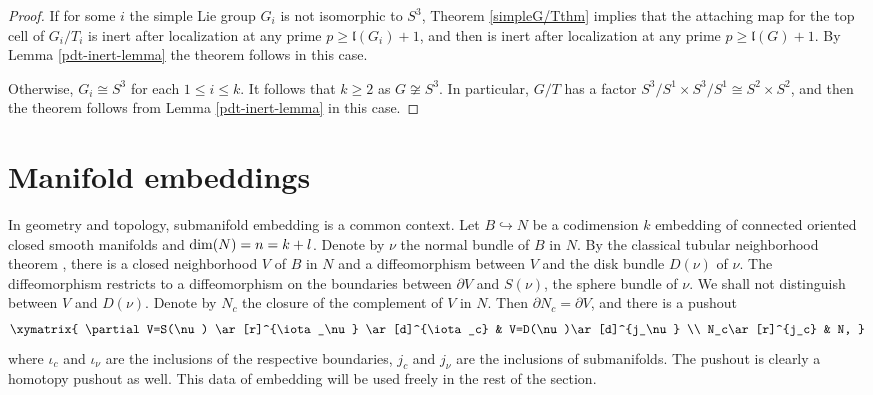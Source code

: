\documentclass[a4]{amsart}
\theoremstyle{definition}
\begin{document}
\begin{sloppypar}
\begin{proof}
If for some $i$ the simple Lie group $G_i$ is not isomorphic to $S^3$, Theorem \ref{simpleG/Tthm} implies that the attaching map for the top cell of $G_i/T_i$ is inert after localization at any prime $p\geq  \mathfrak{l}(G_i)+1$, and then is inert after localization at any prime $p\geq  \mathfrak{l}(G)+1$. By Lemma \ref{pdt-inert-lemma} the theorem follows in this case. 

Otherwise, $G_i\cong S^3$ for each $1\leq i\leq k$. It follows that $k\geq 2$ as $G\not\cong S^3$. In particular, $G/T$ has a factor $S^3/S^1\times S^3/S^1\cong S^2\times S^2$, and then the theorem follows from Lemma \ref{pdt-inert-lemma} in this case. 
\end{proof}



\newpage
\section{Manifold embeddings}
\label{sec: emb}

In geometry and topology, submanifold embedding is a common context. Let $B\hookrightarrow N$ be a codimension $k$ embedding of connected oriented closed smooth manifolds and ${\rm dim}(N)=n=k+l$. 
Denote by $\nu$ the normal bundle of $B$ in $N$. By the classical tubular neighborhood theorem \cite[Theorem 11.1]{MS74}, there is a closed neighborhood $V$ of $B$ in $N$ and a diffeomorphism between $V$ and the disk bundle $D(\nu)$ of $\nu$. The diffeomorphism restricts to a diffeomorphism on the boundaries between $\partial V$ and $S(\nu)$, the sphere bundle of $\nu$. 
We shall not distinguish between $V$ and $D(\nu)$.
Denote by $N_c$ the closure of the complement of $V$ in $N$. Then $\partial N_c=\partial V$, and there is a pushout
\begin{equation}
\begin{gathered}
\label{Npushoutdiag}
\xymatrix{
\partial V=S(\nu) \ar[r]^{\iota_\nu} \ar[d]^{\iota_c} &
V=D(\nu)\ar[d]^{j_\nu} \\
N_c\ar[r]^{j_c} &
N,
}
\end{gathered}
\end{equation} 
where $\iota_c$ and $\iota_\nu$ are the inclusions of the respective boundaries, $j_c$ and $j_\nu$ are the inclusions of submanifolds. The pushout is clearly a homotopy pushout as well. 
This data of embedding will be used freely in the rest of the section. 


\end{sloppypar}
\end{document}
